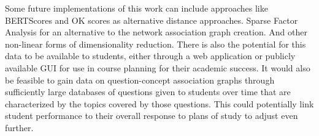 \documentclass[11pt]{report}
\begin{document}
Some future implementations of this work can include approaches like BERTScores and OK scores as alternative distance 
approaches. Sparse Factor Analysis for an alternative to the network association graph creation. And other non-linear forms of dimensionality reduction.  There is also the potential for this data to be available to students, either through a web application or publicly available GUI for use in course planning for their academic success. 
It would also be feasible to gain data on question-concept association graphs \citep{willcox_network_2017} through sufficiently large databases of questions 
given to students over time that are characterized by the topics covered by those questions. This could potentially link student 
performance to their overall response to plans of study to adjust even further. 


\cleardoublepage




\cleardoublepage


\end{document}
